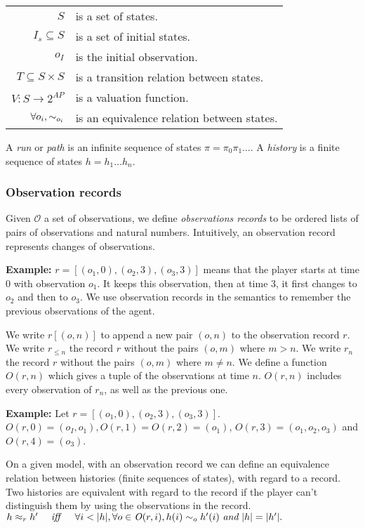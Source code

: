 \begin{tabular}{r l}
$S$& is a set of states.\\
$I_s\subseteq S$& is a set of initial states.\\
$o_I$& is the initial observation.\\
$T\subseteq S\times S$& is a transition relation between states.\\
$V:S\rightarrow 2^{\mathit{AP}}$& is a valuation function.\\
$\forall o_i, \sim_{o_i}$& is an equivalence relation between states.
\end{tabular}

A \textit{run} or \textit{path} is an infinite sequence of states $\pi=\pi_0\pi_1\dots$. A \textit{history} is a finite sequence of states $h=h_1\dots h_n$.

\subsubsection{Observation records}
Given $\mathcal{O}$ a set of observations, we define \textit{observations records} to be ordered lists of pairs of observations and natural numbers.
Intuitively, an observation record represents changes of observations.

\textbf{Example:}  $r=[(o_1,0),(o_2,3),(o_3,3)]$ means that the player starts at time 0 with observation $o_1$. It keeps this observation, then at time 3, it first changes to $o_2$ and then to $o_3$. We use observation records in the semantics to remember the previous observations of the agent.

We write $r[(o,n)]$ to append a new pair $(o,n)$ to the observation record $r$.
We write $r_{\leq n}$ the record $r$ without the pairs $(o,m)$ where $m>n$.
We write $r_n$ the record $r$ without the pairs $(o,m)$ where $m\neq n$. 
We define a function $\mathit{O}(r,n)$ which gives a tuple of the observations at time $n$. $\mathit{O}(r,n)$ includes every observation of $r_n$, as well as the previous one.

\textbf{Example:} Let $r=[(o_1,0),(o_2,3),(o_3,3)]$. $\mathit{O}(r,0)=(o_I,o_1), \mathit{O}(r,1)=\mathit{O}(r,2)=(o_1)$, $\mathit{O}(r,3)=(o_1,o_2,o_3)$ and $\mathit{O}(r,4)=(o_3)$.

On a given model, with an observation record we can define an equivalence relation between histories (finite sequences of states), with regard to a record. Two histories are equivalent with regard to the record if the player can't distinguish them by using the observations in the record.\\
$h\approx_{r}h'\quad\ \mathit{iff}\ \quad \forall i< |h|, \forall o\in \mathit{O}(r,i), h(i)\sim_{o} h'(i)~\textit{and}~|h|=|h'|.$

